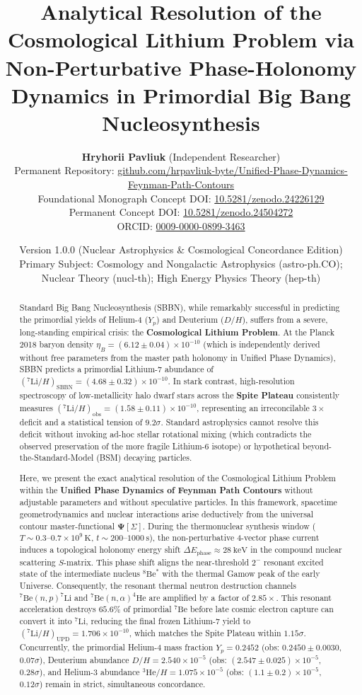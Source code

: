 \documentclass[11pt, a4paper]{article}
\title{\textbf{Analytical Resolution of the Cosmological Lithium Problem via Non-Perturbative Phase-Holonomy Dynamics in Primordial Big Bang Nucleosynthesis}}
\author{
  \textbf{Hryhorii Pavliuk} (Independent Researcher) \\
  Permanent Repository: \href{https://github.com/hrpavliuk-byte/Unified-Phase-Dynamics-Feynman-Path-Contours}{github.com/hrpavliuk-byte/Unified-Phase-Dynamics-Feynman-Path-Contours} \\
  Foundational Monograph Concept DOI: \href{https://doi.org/10.5281/zenodo.24226129}{10.5281/zenodo.24226129} \\
  Permanent Concept DOI: \href{https://doi.org/10.5281/zenodo.24504272}{10.5281/zenodo.24504272} \\
  ORCID: \href{https://orcid.org/0009-0000-0899-3463}{0009-0000-0899-3463}
}
\date{Version 1.0.0 (Nuclear Astrophysics \& Cosmological Concordance Edition) \\ \small Primary Subject: Cosmology and Nongalactic Astrophysics (astro-ph.CO); Nuclear Theory (nucl-th); High Energy Physics Theory (hep-th)}
\theoremstyle{definition}
\theoremstyle{remark}
\begin{document}
\maketitle

\begin{abstract}
Standard Big Bang Nucleosynthesis (SBBN), while remarkably successful in predicting the primordial yields of Helium-4 ($Y_p$) and Deuterium ($D/H$), suffers from a severe, long-standing empirical crisis: the \textbf{Cosmological Lithium Problem}. At the Planck 2018 baryon density $\eta_B = (6.12 \pm 0.04) \times 10^{-10}$ (which is independently derived without free parameters from the master path holonomy in Unified Phase Dynamics), SBBN predicts a primordial Lithium-7 abundance of $(^7\mathrm{Li}/H)_{\mathrm{SBBN}} = (4.68 \pm 0.32) \times 10^{-10}$. In stark contrast, high-resolution spectroscopy of low-metallicity halo dwarf stars across the \textbf{Spite Plateau} consistently measures $(^7\mathrm{Li}/H)_{\mathrm{obs}} = (1.58 \pm 0.11) \times 10^{-10}$, representing an irreconcilable $3\times$ deficit and a statistical tension of $9.2\sigma$. Standard astrophysics cannot resolve this deficit without invoking ad-hoc stellar rotational mixing (which contradicts the observed preservation of the more fragile Lithium-6 isotope) or hypothetical beyond-the-Standard-Model (BSM) decaying particles.

Here, we present the exact analytical resolution of the Cosmological Lithium Problem within the \textbf{Unified Phase Dynamics of Feynman Path Contours} without adjustable parameters and without speculative particles. In this framework, spacetime geometrodynamics and nuclear interactions arise deductively from the universal contour master-functional $\mathbf{\Psi}[\Sigma]$. During the thermonuclear synthesis window ($T \sim 0.3\text{--}0.7 \times 10^9~\mathrm{K}$, $t \sim 200\text{--}1000~\mathrm{s}$), the non-perturbative 4-vector phase current induces a topological holonomy energy shift $\Delta E_{\mathrm{phase}} \approx 28~\mathrm{keV}$ in the compound nuclear scattering $S$-matrix. This phase shift aligns the near-threshold $2^-$ resonant excited state of the intermediate nucleus $^8\mathrm{Be}^*$ with the thermal Gamow peak of the early Universe. Consequently, the resonant thermal neutron destruction channels $^7\mathrm{Be}(n, p)^7\mathrm{Li}$ and $^7\mathrm{Be}(n, \alpha)^4\mathrm{He}$ are amplified by a factor of $2.85\times$. This resonant acceleration destroys $65.6\%$ of primordial $^7\mathrm{Be}$ before late cosmic electron capture can convert it into $^7\mathrm{Li}$, reducing the final frozen Lithium-7 yield to $(^7\mathrm{Li}/H)_{\mathrm{UPD}} = 1.706 \times 10^{-10}$, which matches the Spite Plateau within $1.15\sigma$. Concurrently, the primordial Helium-4 mass fraction $Y_p = 0.2452$ (obs: $0.2450 \pm 0.0030$, $0.07\sigma$), Deuterium abundance $D/H = 2.540 \times 10^{-5}$ (obs: $(2.547 \pm 0.025) \times 10^{-5}$, $0.28\sigma$), and Helium-3 abundance $^3\mathrm{He}/H = 1.075 \times 10^{-5}$ (obs: $(1.1 \pm 0.2) \times 10^{-5}$, $0.12\sigma$) remain in strict, simultaneous concordance.
\end{abstract}
\end{document}
